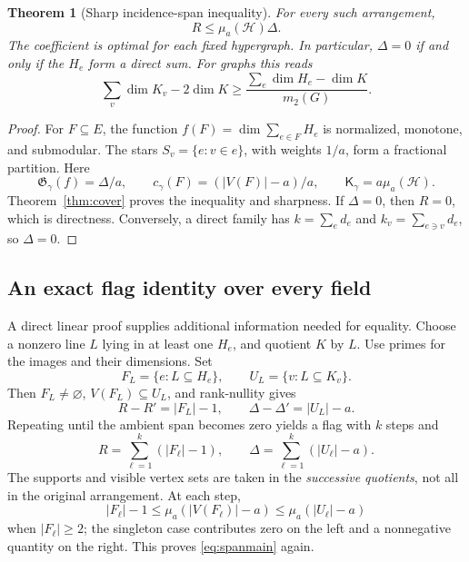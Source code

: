 \documentclass[11pt]{article}
\newtheorem{theorem}{Theorem}[section]
\theoremstyle{definition}
\theoremstyle{remark}
\newcommand{\1}{\mathbf 1}
\newcommand{\Gap}{\mathfrak G}
\newcommand{\Kopt}{\mathsf K}
\begin{document}
\begin{theorem}[Sharp incidence-span inequality]
\label{thm:span}
For every such arrangement,
\begin{equation}
 \boxed{\displaystyle R\le\mu_a(\mathcal H)\Delta.}
 \label{eq:spanmain}
\end{equation}
The coefficient is optimal for each fixed hypergraph. In particular,
$\Delta=0$ if and only if the $H_e$ form a direct sum. For graphs this reads
\begin{equation}
 \sum_v\dim K_v-2\dim K
 \ge\frac{\sum_e\dim H_e-\dim K}{m_2(G)}.
 \label{eq:graphspan}
\end{equation}
\end{theorem}

\begin{proof}
For $F\subseteq E$, the function $f(F)=\dim\sum_{e\in F}H_e$ is normalized,
monotone, and submodular. The stars $S_v=\{e:v\in e\}$, with weights $1/a$,
form a fractional partition. Here
\[
 \Gap_\gamma(f)=\Delta/a,\qquad
 c_\gamma(F)=(|V(F)|-a)/a,\qquad
 \Kopt_\gamma=a\mu_a(\mathcal H).
\]
Theorem~\ref{thm:cover} proves the inequality and sharpness.
If $\Delta=0$, then $R=0$, which is directness. Conversely, a direct family has
$k=\sum_e d_e$ and $k_v=\sum_{e\ni v}d_e$, so $\Delta=0$.
\end{proof}

\subsection{An exact flag identity over every field}

A direct linear proof supplies additional information needed for equality.
Choose a nonzero line $L$ lying in at least one $H_e$, and quotient $K$ by $L$.
Use primes for the images and their dimensions. Set
\[
 F_L=\{e:L\subseteq H_e\},\qquad U_L=\{v:L\subseteq K_v\}.
\]
Then $F_L\ne\varnothing$, $V(F_L)\subseteq U_L$, and rank-nullity gives
\begin{equation}
 R-R'=|F_L|-1,\qquad
 \Delta-\Delta'=|U_L|-a.
 \label{eq:linearstep}
\end{equation}
Repeating until the ambient span becomes zero yields a flag with $k$ steps and
\begin{equation}
 \boxed{\displaystyle
 R=\sum_{\ell=1}^k(|F_\ell|-1),\qquad
 \Delta=\sum_{\ell=1}^k(|U_\ell|-a).}
 \label{eq:flag}
\end{equation}
The supports and visible vertex sets are taken in the \emph{successive
quotients}, not all in the original arrangement. At each step,
\[
 |F_\ell|-1\le\mu_a(|V(F_\ell)|-a)
 \le\mu_a(|U_\ell|-a)
\]
when $|F_\ell|\ge2$; the singleton case contributes zero on the left and a
nonnegative quantity on the right. This proves \eqref{eq:spanmain} again.
\end{document}
